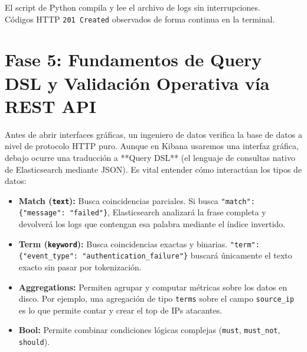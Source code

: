 \documentclass[
  coursetitle={Cómputo Nube y Tecnologías Emergentes},
  coursehours={96},
  coursedate={Verano 2026},
  doctype={Guía de Laboratorio Práctico},
  otherlangs={english,french},
  authorname={Lázaro},
  authorsurname={Bustio-Martínez},
  authortitle={PhD},
  role={Profesor Investigador},
  email={lbustio@inaoe.mx},
  phone={5559504000},
  ext={7459},
  institution={Instituto Nacional de Astrofísica, Óptica y Electrónica (INAOE)},
  department={Maestría en Ciencias en Tecnologías de Seguridad},
  address={Luis Enrique Erro 1, Sta. Ma. Tonantzintla, San Andrés Cholula, CP 72840, Puebla, México},
  margin={0.5in}
]{../../lbustio_lecture_notes}
\begin{document}
\begin{tcolorbox}[colback=green!5!white,colframe=green!60!black,title=\textbf{Checkpoint de Validación 3}]
\checkmark El script de Python compila y lee el archivo de logs sin interrupciones.\\
\checkmark Códigos HTTP \texttt{201 Created} observados de forma continua en la terminal.
\end{tcolorbox}

\section{Fase 5: Fundamentos de Query DSL y Validación Operativa vía REST API}
Antes de abrir interfaces gráficas, un ingeniero de datos verifica la base de datos a nivel de protocolo HTTP puro. Aunque en Kibana usaremos una interfaz gráfica, debajo ocurre una traducción a **Query DSL** (el lenguaje de consultas nativo de Elasticsearch mediante JSON). Es vital entender cómo interactúan los tipos de datos:

\begin{itemize}
    \item \textbf{Match (\texttt{text}):} Busca coincidencias parciales. Si busca \texttt{"match": \{"message": "failed"\}}, Elasticsearch analizará la frase completa y devolverá los logs que contengan esa palabra mediante el índice invertido.
    \item \textbf{Term (\texttt{keyword}):} Busca coincidencias exactas y binarias. \texttt{"term": \{"event\_type": "authentication\_failure"\}} buscará únicamente el texto exacto sin pasar por tokenización.
    \item \textbf{Aggregations:} Permiten agrupar y computar métricas sobre los datos en disco. Por ejemplo, una agregación de tipo \texttt{terms} sobre el campo \texttt{source\_ip} es lo que permite contar y crear el top de IPs atacantes.
    \item \textbf{Bool:} Permite combinar condiciones lógicas complejas (\texttt{must}, \texttt{must\_not}, \texttt{should}).
\end{itemize}
\end{document}
